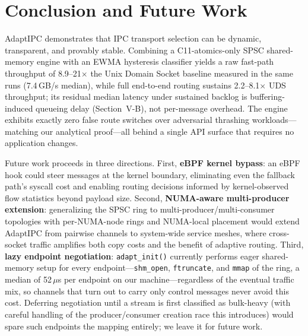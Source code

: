 \documentclass[conference]{IEEEtran}
\begin{document}
\section{Conclusion and Future Work}
AdaptIPC demonstrates that IPC transport selection can be dynamic,
transparent, and provably stable. Combining a C11-atomics-only SPSC
shared-memory engine with an EWMA hysteresis classifier yields a raw
fast-path throughput of 8.9--21$\times$ the Unix Domain Socket baseline
measured in the same runs (7.4\,GB/s median), while full end-to-end
routing sustains 2.2--8.1$\times$ UDS throughput; its residual median
latency under sustained backlog is buffering-induced queueing delay
(Section~V-B), not per-message overhead. The engine exhibits exactly zero false route
switches over adversarial thrashing workloads---matching our analytical
proof---all behind a single API surface that requires no application changes.

Future work proceeds in three directions. First, \textbf{eBPF kernel bypass}:
an eBPF hook could steer messages at the kernel boundary, eliminating even
the fallback path's syscall cost and enabling routing decisions informed by
kernel-observed flow statistics beyond payload size. Second,
\textbf{NUMA-aware multi-producer extension}: generalizing the SPSC ring to
multi-producer/multi-consumer topologies with per-NUMA-node rings and
NUMA-local placement would extend AdaptIPC from pairwise channels to
system-wide service meshes, where cross-socket traffic amplifies both copy
costs and the benefit of adaptive routing. Third, \textbf{lazy endpoint
negotiation}: \texttt{adapt\_init()} currently performs eager shared-memory
setup for every endpoint---\texttt{shm\_open}, \texttt{ftruncate}, and
\texttt{mmap} of the ring, a median of 52\,$\mu$s per endpoint on our
machine---regardless of the eventual traffic mix, so channels that turn out
to carry only control messages never avoid this cost. Deferring negotiation
until a stream is first classified as bulk-heavy (with careful handling of
the producer/consumer creation race this introduces) would spare such
endpoints the mapping entirely; we leave it for future work.
\end{document}
